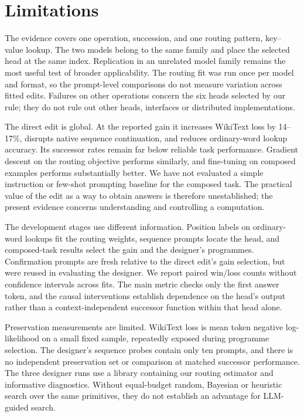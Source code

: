 \documentclass[11pt]{article}
\begin{document}
\section{Limitations}\label{sec:limits}

The evidence covers one operation, succession, and one routing pattern, key--value lookup. The two models belong to the same family and place the selected head at the same index. Replication in an unrelated model family remains the most useful test of broader applicability. The routing fit was run once per model and format, so the prompt-level comparisons do not measure variation across fitted edits. Failures on other operations concern the six heads selected by our rule; they do not rule out other heads, interfaces or distributed implementations.

The direct edit is global. At the reported gain it increases WikiText loss by 14--17\%, disrupts native sequence continuation, and reduces ordinary-word lookup accuracy. Its successor rates remain far below reliable task performance. Gradient descent on the routing objective performs similarly, and fine-tuning on composed examples performs substantially better. We have not evaluated a simple instruction or few-shot prompting baseline for the composed task. The practical value of the edit as a way to obtain answers is therefore unestablished; the present evidence concerns understanding and controlling a computation.

The development stages use different information. Position labels on ordinary-word lookups fit the routing weights, sequence prompts locate the head, and composed-task results select the gain and the designer's programmes. Confirmation prompts are fresh relative to the direct edit's gain selection, but were reused in evaluating the designer. We report paired win/loss counts without confidence intervals across fits. The main metric checks only the first answer token, and the causal interventions establish dependence on the head's output rather than a context-independent successor function within that head alone.

Preservation measurements are limited. WikiText loss is mean token negative log-likelihood on a small fixed sample, repeatedly exposed during programme selection. The designer's sequence probes contain only ten prompts, and there is no independent preservation set or comparison at matched successor performance. The three designer runs use a library containing our routing estimator and informative diagnostics. Without equal-budget random, Bayesian or heuristic search over the same primitives, they do not establish an advantage for LLM-guided search.
\end{document}

